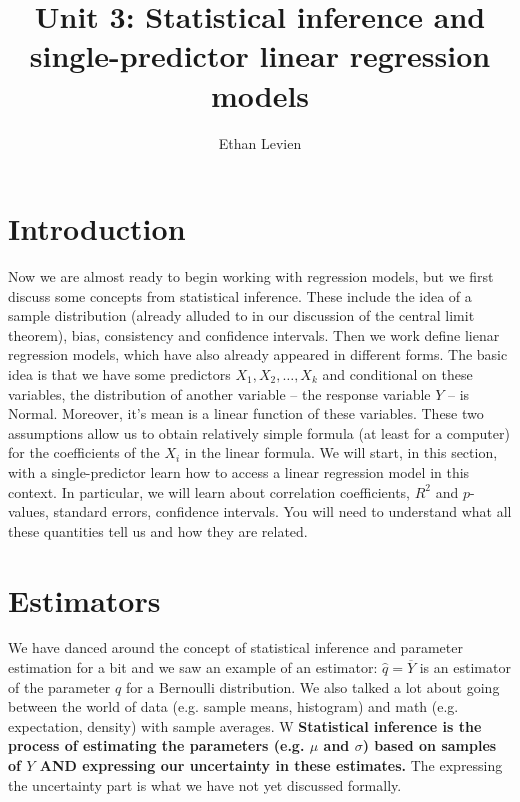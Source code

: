 
\setcounter{unit}{3}
\setcounter{section}{0}



\title{Unit 3: Statistical inference and single-predictor linear regression models}
\author{Ethan Levien}
\maketitle
\tableofcontents



\newif\ifhideproofs

\ifhideproofs
\usepackage{environ}
\NewEnviron{hide}{}
\let\proof\hide
\let\endproof\endhide
\fi






\section{Introduction}


Now we are almost ready to begin working with regression models, but we first discuss some concepts from statistical inference. These include the idea of a sample distribution (already alluded to in our discussion of the central limit theorem), bias, consistency and confidence intervals. Then we work define lienar regression models, which have also already appeared in different forms.    The basic idea is that we have some predictors $X_1,X_2,\dots,X_k$ and conditional on these variables, the distribution of another variable -- the response variable $Y$ -- is Normal. Moreover, it's mean is a linear function of these variables. These two assumptions allow us to obtain relatively simple formula (at least for a computer) for the coefficients of the $X_i$ in the linear formula. We will start, in this section, with a single-predictor learn how to access a linear regression model in this context. In particular, we will learn about correlation coefficients, $R^2$ and $p$-values, standard errors, confidence intervals. You will need to understand what all these quantities tell us and how they are related. 





\section{Estimators}
We have danced around the concept of statistical inference and parameter estimation for a bit and we saw an example of an estimator: $\hat{q} = \overline{Y}$ is an estimator of the parameter $q$ for a Bernoulli distribution.  We also talked a lot about going between the world of data (e.g. sample means, histogram) and math (e.g. expectation, density) with sample averages. W
{\bf Statistical inference is the process of estimating the parameters (e.g. $\mu$ and $\sigma$) based on samples of $Y$ AND expressing our uncertainty in these estimates.} The expressing the uncertainty part is what we have not yet discussed formally. 



